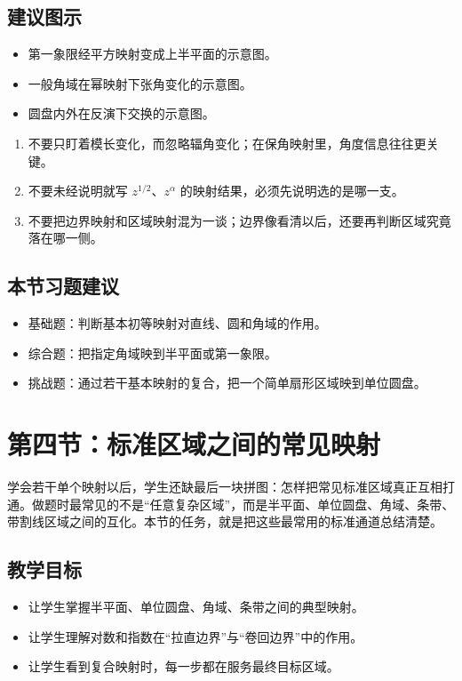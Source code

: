 \subsection*{建议图示}
\begin{itemize}
    \item 第一象限经平方映射变成上半平面的示意图。
    \item 一般角域在幂映射下张角变化的示意图。
    \item 圆盘内外在反演下交换的示意图。
\end{itemize}

\begin{jinshi}[本节易错点]
\begin{enumerate}
    \item 不要只盯着模长变化，而忽略辐角变化；在保角映射里，角度信息往往更关键。
    \item 不要未经说明就写 $z^{1/2}$、$z^\alpha$ 的映射结果，必须先说明选的是哪一支。
    \item 不要把边界映射和区域映射混为一谈；边界像看清以后，还要再判断区域究竟落在哪一侧。
\end{enumerate}
\end{jinshi}

\subsection*{本节习题建议}
\begin{itemize}
    \item 基础题：判断基本初等映射对直线、圆和角域的作用。
    \item 综合题：把指定角域映到半平面或第一象限。
    \item 挑战题：通过若干基本映射的复合，把一个简单扇形区域映到单位圆盘。
\end{itemize}

\section{第四节：标准区域之间的常见映射}

\begin{wulibj}[本节要解决的问题]
学会若干单个映射以后，学生还缺最后一块拼图：怎样把常见标准区域真正互相打通。做题时最常见的不是``任意复杂区域''，而是半平面、单位圆盘、角域、条带、带割线区域之间的互化。本节的任务，就是把这些最常用的标准通道总结清楚。
\end{wulibj}

\subsection*{教学目标}
\begin{itemize}
    \item 让学生掌握半平面、单位圆盘、角域、条带之间的典型映射。
    \item 让学生理解对数和指数在``拉直边界''与``卷回边界''中的作用。
    \item 让学生看到复合映射时，每一步都在服务最终目标区域。
\end{itemize}

